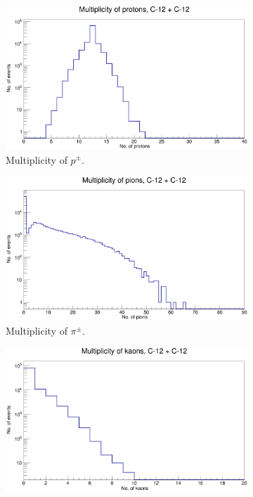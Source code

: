 \documentclass[12pt, twocolumn]{article}
\begin{document}
\begin{figure}[h]
\centering
\begin{subfigure}[h]{0.49\textwidth}
\centering
\includegraphics[scale=0.14]{ProtonMultiplicity_C12.png}
\caption{Multiplicity of $p^{\pm}$.}
\label{Multiplicity of protons C12.}
\end{subfigure}
\hfill
\vspace*{0.8cm}
\begin{subfigure}[h]{0.49\textwidth}
\centering
\includegraphics[scale=0.14]{PionMultiplicity_C12.png}
\caption{Multiplicity of $\pi^{\pm}$.}
\label{Multiplicity of pions C12.}
\end{subfigure}
\hfill
\begin{subfigure}[h]{0.49\textwidth}
\centering
\includegraphics[scale=0.14]{KaonMultiplicity_C12.png}

\end{subfigure}
\end{figure}
\end{document}
